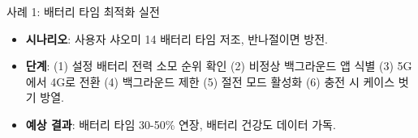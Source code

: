 \begin{tcbinfo}{사례 1: 배터리 타임 최적화 실전}
\begin{itemize}
  \item \textbf{시나리오}: 사용자 샤오미 14 배터리 타임 저조, 반나절이면 방전.
  \item \textbf{단계}: (1) 설정 배터리 전력 소모 순위 확인 (2) 비정상 백그라운드 앱 식별 (3) 5G에서 4G로 전환 (4) 백그라운드 제한 (5) 절전 모드 활성화 (6) 충전 시 케이스 벗기 방열.
  \item \textbf{예상 결과}: 배터리 타임 30-50\% 연장, 배터리 건강도 데이터 가독.
\end{itemize}

\end{tcbinfo}

